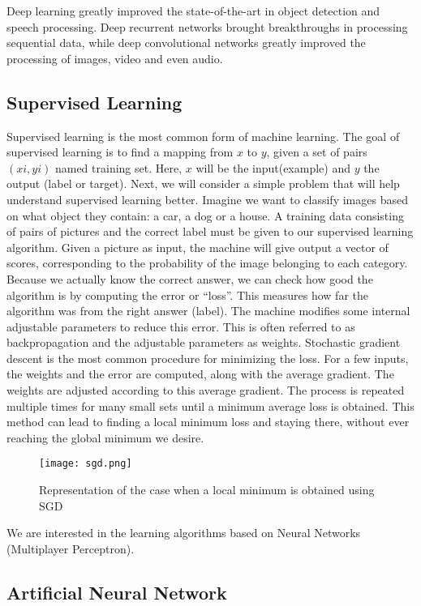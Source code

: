 \documentclass[../Thesis.tex]{subfiles}
\begin{document}
Deep learning greatly improved the state-of-the-art in object detection and speech processing. Deep recurrent networks brought breakthroughs in processing sequential data, while deep convolutional networks greatly improved the processing of images, video and even audio.


\subsection {Supervised Learning}

Supervised learning is the most common form of machine learning. The goal of supervised learning is to find a mapping from $x$ to $y$, given a set of pairs $(xi, yi)$ named training set. Here, $x$ will be the input(example) and $y$ the output (label or target).  Next, we will consider a simple problem that will help understand supervised learning better. Imagine we want to classify images based on what object they contain: a car, a dog or a house. A training data consisting of pairs of pictures and the correct label must be given to our supervised learning algorithm. Given a picture as input, the machine will give output a vector of scores, corresponding to the probability of the image belonging to each category. Because we actually know the correct answer, we can check how good the algorithm is by computing the error or “loss”. This measures how far the algorithm was from the right answer (label). The machine modifies some internal adjustable parameters to reduce this error. This is often referred to as backpropagation and the adjustable parameters as weights.
Stochastic gradient descent is the most common procedure for minimizing the loss. For a few inputs, the weights and the error are computed, along with the average gradient. The weights are adjusted according to this average gradient. The process is repeated multiple times for many small sets until a minimum average loss is obtained. This method can lead to finding a local minimum loss and staying there, without ever reaching the global minimum we desire.

\begin{figure}[h]
\centering
\label {fig: sgd}
\texttt{[image: sgd.png]}
\caption[width=0.5\textwidth]{Representation of the case when a local minimum is obtained using SGD}
\end{figure}
 
We are interested in the learning algorithms based on Neural Networks (Multiplayer Perceptron).


\subsection {Artificial Neural Network}
\end{document}
